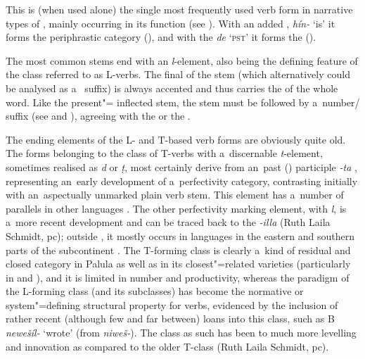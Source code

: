  This is (when used alone) the single most frequently used verb form in
narrative types of , mainly occurring in its  function (see ). With an added , \textit{hín-} `is' it forms the periphrastic category  (), and with the  \textit{de} `\textsc{pst}' it forms the  ().


The most common  stems end with an \textit{l}-element,
also being the defining feature of the class referred to as L-verbs. The final  of the stem
(which alternatively could be analysed as a~ suffix) is always accented and thus carries
the  of the whole word. Like the present"= inflected stem, the  stem must be
followed by a~number/ suffix (see  and ), agreeing with
the   or the  .



The ending elements of the L- and T-based  verb forms are obviously quite old. The  forms belonging to the class of T-verbs with a~discernable \textit{t}-element, sometimes realised as \textit{d} or \textit{ṭ}, most certainly derive from an~\iliOIA past () participle \textit{-ta} \citep[952]{whitney1960}, representing an~early development of a~perfectivity category, contrasting initially with an~aspectually unmarked plain verb stem. This element has a~number of parallels in other \iliNIA languages \citep[269, 272]{masica1991}. The other perfectivity marking element, with \textit{l}, is a~more recent development and can be traced back to the \iliPrakrit \textit{-illa} (Ruth Laila Schmidt, pc); outside \iliShina, it mostly occurs in \iliNIA languages in the eastern and southern parts of the subcontinent \citep[270]{masica1991}. The T-forming class is clearly a~kind of residual and closed category in Palula as well as in its closest"=related varieties (particularly in \iliSauji and \iliKalkoti), and it is limited in number and productivity, whereas the paradigm of the L-forming class (and its subclasses) has become the normative or system"=defining structural property \citep[104]{mcmahon1994} for verbs, evidenced by the inclusion of rather recent (although few and far between) loans into this class, such as B \textit{newešíl-} `wrote' (from \iliKhowar \textit{niweš-}). The class as such has been  to much more levelling and innovation as compared to the older T-class (Ruth Laila Schmidt, pc).


